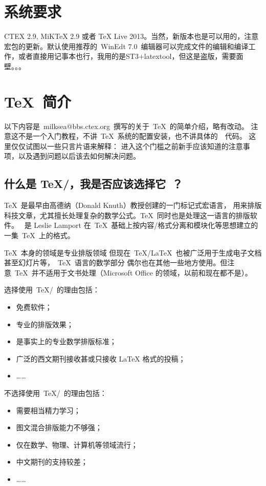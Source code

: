 \section{系统要求}
    CTEX 2.9, MiKTeX 2.9 或者 TeX Live 2013。当然，新版本也是可以用的，注意宏包的更新。默认使用推荐的~WinEdt 7.0~编辑器可以完成文件的编辑和编译工作，或者直接用记事本也行，我用的是ST3+latextool，但这是盗版，需要面壁。。。

\section{\TeX~简介}

以下内容是~milksea@bbs.ctex.org~撰写的关于~\TeX~的简单介绍，略有改动。
注意这不是一个入门教程，不讲~\TeX~系统的配置安装，也不讲具体的~\XeLaTeX~代码。
这里仅仅试图以一些只言片语来解释：
进入这个门槛之前新手应该知道的注意事项，以及遇到问题以后该去如何解决问题。

\subsection{什么是 \TeX/\XeLaTeX，我是否应该选择它~？}

\TeX~是最早由高德纳（Donald Knuth）教授创建的一门标记式宏语言，
用来排版科技文章，尤其擅长处理复杂的数学公式。\TeX~同时也是处理这一语言的排版软件。
\XeLaTeX~是 Leslie Lamport 在~\TeX~基础上按内容/格式分离和模块化等思想建立的一集~\TeX~上的格式。

\TeX~本身的领域是专业排版领域
但现在~TeX/LaTeX~也被广泛用于生成电子文档甚至幻灯片等，~\TeX~语言的数学部分
偶尔也在其他一些地方使用。但注意~\TeX~并不适用于文书处理（Microsoft Office 的领域，以前和现在都不是）。

选择使用~\TeX/\XeLaTeX~的理由包括：
\begin{itemize}
\item 免费软件；
\item 专业的排版效果；
\item 是事实上的专业数学排版标准；
\item 广泛的西文期刊接收甚或只接收 LaTeX 格式的投稿；
\item[] ……
\end{itemize}
不选择使用~\TeX/\XeLaTeX~的理由包括：
\begin{itemize}
\item 需要相当精力学习；
\item 图文混合排版能力不够强；
\item 仅在数学、物理、计算机等领域流行；
\item 中文期刊的支持较差；
\item[] ……
\end{itemize}

